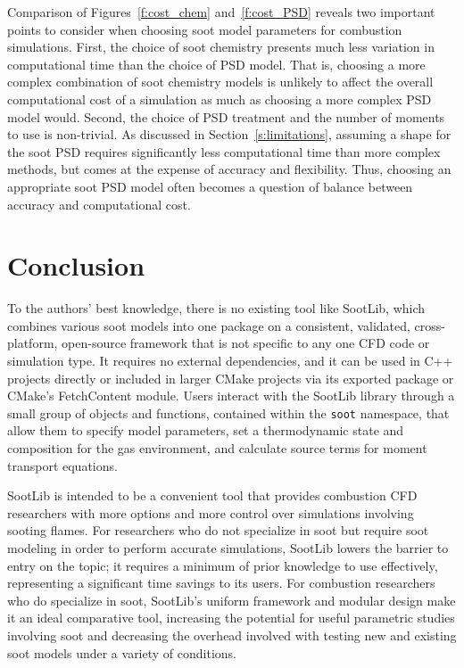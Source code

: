 \documentclass[preprint,letterpaper]{elsarticle}
\begin{document}

Comparison of Figures~\ref{f:cost_chem} and~\ref{f:cost_PSD} reveals two important points to consider when choosing soot model parameters for combustion simulations. First, the choice of soot chemistry presents much less variation in computational time than the choice of PSD model. That is, choosing a more complex combination of soot chemistry models is unlikely to affect the overall computational cost of a simulation as much as choosing a more complex PSD model would. Second, the choice of PSD treatment and the number of moments to use is non-trivial. As discussed in Section~\ref{s:limitations}, assuming a shape for the soot PSD requires significantly less computational time than more complex methods, but comes at the expense of accuracy and flexibility. Thus, choosing an appropriate soot PSD model often becomes a question of balance between accuracy and computational cost.


\section{Conclusion}
\label{s:soot-conclusion}

To the authors' best knowledge, there is no existing tool like SootLib, which combines various soot models into one package on a consistent, validated, cross-platform, open-source framework that is not specific to any one CFD code or simulation type. It requires no external dependencies, and it can be used in C++ projects directly or included in larger CMake projects via its exported package or CMake's FetchContent module. Users interact with the SootLib library through a small group of objects and functions, contained within the \texttt{soot} namespace, that allow them to specify model parameters, set a thermodynamic state and composition for the gas environment, and calculate source terms for moment transport equations.

SootLib is intended to be a convenient tool that provides combustion CFD researchers with more options and more control over simulations involving sooting flames. For researchers who do not specialize in soot but require soot modeling in order to perform accurate simulations, SootLib lowers the barrier to entry on the topic; it requires a minimum of prior knowledge to use effectively, representing a significant time savings to its users. For combustion researchers who do specialize in soot, SootLib's uniform framework and modular design make it an ideal comparative tool, increasing the potential for useful parametric studies involving soot and decreasing the overhead involved with testing new and existing soot models under a variety of conditions.
\end{document}
